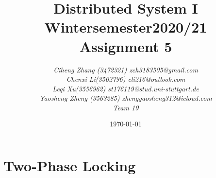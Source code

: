 \documentclass{article}
\begin{document}
\begin{titlepage}
    \title{\Huge \textbf{Distributed System I\\Wintersemester2020/21\\Assignment 5} }
    \author{\LARGE \textsl{Ciheng Zhang (3472321) zch3183505@gmail.com}\\\LARGE \textsl{Chenxi Li(3502796) cli216@outlook.com }\\\LARGE \textsl{Leqi Xu(3556962) st176119@stud.uni-stuttgart.de} \\\LARGE \textsl{Yaosheng Zheng (3563285) zhengyaosheng312@icloud.com}\\\LARGE \textsl{Team 19 } \\[200pt]}
    \date{\today}
    \maketitle
    \thispagestyle{empty}
\end{titlepage}
\newpage
\section{Two-Phase Locking}
\end{document}
